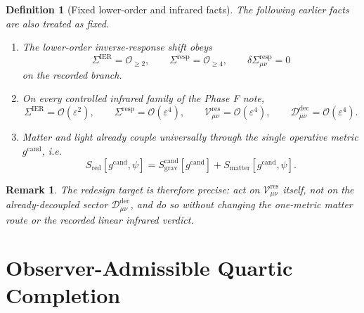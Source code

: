 \documentclass[11pt]{article}
\newcommand{\CandidateMetric}{g^{\mathrm{cand}}}
\newcommand{\BaseShift}{\Sigma^{\mathrm{IER}}}
\newcommand{\ResponseShift}{\Sigma^{\mathrm{resp}}}
\newcommand{\ResidualCore}{\mathcal V_{\mu\nu}^{\mathrm{res}}}
\newcommand{\ResidualDec}{\mathcal D_{\mu\nu}^{\mathrm{dec}}}
\newcommand{\epsIR}{\varepsilon}
\newcommand{\MatterAct}{S_{\mathrm{matter}}}
\newtheorem{definition}{Definition}
\newtheorem{remark}{Remark}
\begin{document}
\begin{definition}[Fixed lower-order and infrared facts]
\label{def:fixed}
The following earlier facts are also treated as fixed.
\begin{enumerate}
    \item The lower-order inverse-response shift obeys
    \begin{equation}
    \BaseShift=\mathcal O_{\ge 2},
    \qquad
    \ResponseShift=\mathcal O_{\ge 4},
    \qquad
    \delta\ResponseShift_{\mu\nu}=0
    \label{eq:orders}
    \end{equation}
    on the recorded branch.
    \item On every controlled infrared family of the Phase F note,
    \begin{equation}
    \BaseShift=\mathcal O(\epsIR^2),
    \qquad
    \ResponseShift=\mathcal O(\epsIR^4),
    \qquad
    \ResidualCore=\mathcal O(\epsIR^4),
    \qquad
    \ResidualDec=\mathcal O(\epsIR^4).
    \label{eq:phaseF}
    \end{equation}
    \item Matter and light already couple universally through the single operative metric \(\CandidateMetric\), i.e.
    \begin{equation}
    S_{\mathrm{red}}[\CandidateMetric,\psi]
    =
    S_{\mathrm{grav}}^{\mathrm{cand}}[\CandidateMetric]
    +\MatterAct[\CandidateMetric,\psi].
    \label{eq:mattercand}
    \end{equation}
\end{enumerate}
\end{definition}

\begin{remark}
The redesign target is therefore precise: act on \(\ResidualCore\) itself, not on the already-decoupled sector \(\ResidualDec\), and do so without changing the one-metric matter route or the recorded linear infrared verdict.
\end{remark}

\section{Observer-Admissible Quartic Completion}
\end{document}
